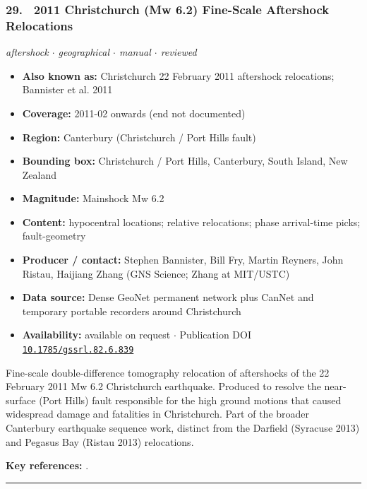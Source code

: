 \documentclass[10pt,a4paper]{article}
\newcommand{\catentryrule}{\par\vspace{3pt}\noindent\textcolor{rulegrey}{\rule{\linewidth}{0.3pt}}\par\vspace{5pt}}
\newcommand{\kv}[2]{\item \textbf{#1:} #2}
\begin{document}
\subsubsection*{\hypertarget{c:29}{29.}~ 2011 Christchurch (Mw 6.2) Fine-Scale Aftershock Relocations}
{\small\itshape aftershock $\cdot$ geographical $\cdot$ manual $\cdot$ reviewed}\par\vspace{2pt}
\begin{itemize}[leftmargin=1.3em,itemsep=0.6pt,topsep=1pt,parsep=0pt]
\kv{Also known as}{Christchurch 22 February 2011 aftershock relocations; Bannister et al. 2011}
\kv{Coverage}{2011-02 onwards (end not documented)}
\kv{Region}{Canterbury (Christchurch / Port Hills fault)}
\kv{Bounding box}{Christchurch / Port Hills, Canterbury, South Island, New Zealand}
\kv{Magnitude}{Mainshock Mw 6.2}
\kv{Content}{hypocentral locations; relative relocations; phase arrival-time picks; fault-geometry}
\kv{Producer / contact}{Stephen Bannister, Bill Fry, Martin Reyners, John Ristau, Haijiang Zhang (GNS Science; Zhang at MIT/USTC)}
\kv{Data source}{Dense GeoNet permanent network plus CanNet and temporary portable recorders around Christchurch}
\kv{Availability}{available on request $\cdot$ Publication DOI \href{https://doi.org/10.1785/gssrl.82.6.839}{\nolinkurl{10.1785/gssrl.82.6.839}}}
\end{itemize}
\par\vspace{2pt}Fine-scale double-difference tomography relocation of aftershocks of the 22 February 2011 Mw 6.2 Christchurch earthquake. Produced to resolve the near-surface (Port Hills) fault responsible for the high ground motions that caused widespread damage and fatalities in Christchurch. Part of the broader Canterbury earthquake sequence work, distinct from the Darfield (Syracuse 2013) and Pegasus Bay (Ristau 2013) relocations.
\par\vspace{2pt}\textbf{Key references:} \cite{Bannister2011}.
\catentryrule
\end{document}
